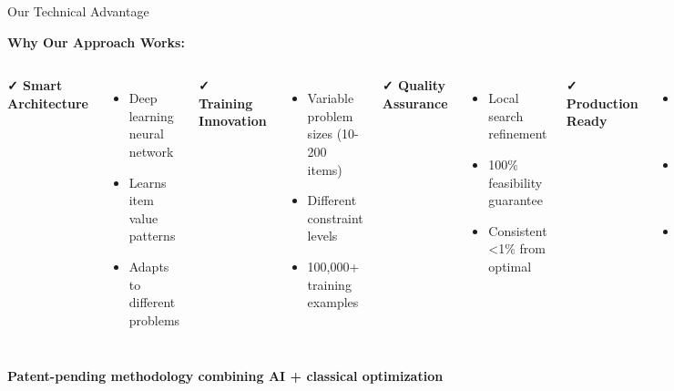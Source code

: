 \documentclass[aspectratio=169]{beamer}
\begin{document}
\begin{frame}{Our Technical Advantage}
\begin{center}
\textbf{Why Our Approach Works:}
\end{center}

\vspace{0.3cm}

\begin{columns}
\textbf{✓ Smart Architecture}
\begin{itemize}
    \item Deep learning neural network
    \item Learns item value patterns
    \item Adapts to different problems
\end{itemize}

\vspace{0.3cm}
\textbf{✓ Training Innovation}
\begin{itemize}
    \item Variable problem sizes (10-200 items)
    \item Different constraint levels
    \item 100,000+ training examples
\end{itemize}

\textbf{✓ Quality Assurance}
\begin{itemize}
    \item Local search refinement
    \item 100\% feasibility guarantee
    \item Consistent <1\% from optimal
\end{itemize}

\vspace{0.3cm}
\textbf{✓ Production Ready}
\begin{itemize}
    \item Handles 10-200 items
    \item Millisecond response time
    \item Easy to integrate
\end{itemize}
\end{columns}

\vspace{0.5cm}
\begin{center}
\textcolor{aiblue}{\textbf{Patent-pending methodology combining AI + classical optimization}}
\end{center}
\end{frame}
\end{document}

